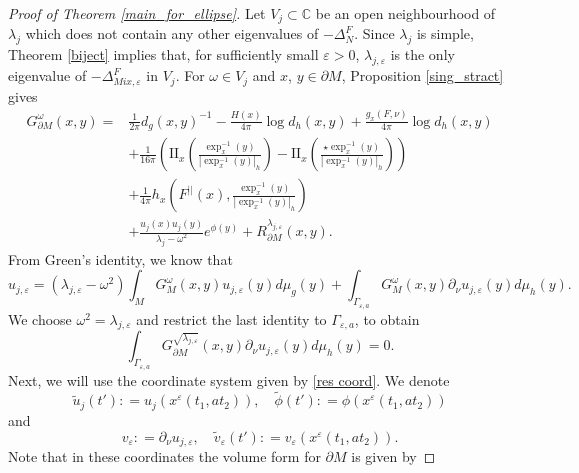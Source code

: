 \documentclass[12pt,a4paper]{amsart}
\numberwithin{equation}{section}
\theoremstyle{plain}
\theoremstyle{definition}
\begin{document}
\begin{proof}[Proof of Theorem \ref{main_for_ellipse}]
	Let $V_j\subset \mathbb{C}$ be an open neighbourhood of $\lambda_j$ which does not contain any other eigenvalues of $-\Delta_N^F$. Since $\lambda_j$ is simple, Theorem \ref{biject} implies that, for sufficiently small $\varepsilon>0$, $\lambda_{j,\varepsilon}$ is the only eigenvalue of $-\Delta_{Mix,\varepsilon}^F$ in $V_j$. For $\omega\in V_j$ and $x$, $y\in \partial M$, Proposition \ref{sing_stract} gives
	\begin{align*}
		G^{\omega}_{\partial M}(x,y)=&\frac{1}{2\pi}d_g(x,y)^{-1} -\frac{H(x)}{4\pi}\log d_h(x,y)+\frac{g_x(F,\nu)}{4\pi}\log d_h(x,y)\\ &+\frac{1}{16\pi}\left(\mathrm{II}_{x}\left(\frac{\exp_{x}^{-1}(y)}{|\exp_{x}^{-1}(y)|_h}\right)-\mathrm{II}_{x}\left(\frac{\star\exp_{x}^{-1}(y)}{|\exp_{x}^{-1}(y)|_h}\right)\right) \\
		& +\frac{1}{4\pi}h_{x}\left(F^{||}(x),\frac{\exp^{-1}_{x}(y)}{|\exp^{-1}_{x}(y)|_h}\right)\\
		& + \frac{u_j(x)u_j(y)}{\lambda_j - \omega^2}e^{\phi(y)}  + R_{\partial M}^{\lambda_{j,\varepsilon}}(x,y).
	\end{align*}
	From Green's identity, we know that
	\begin{equation*}
		u_{j,\varepsilon} = (\lambda_{j,\varepsilon} - \omega^2) \int_{M} G_{M}^\omega(x,y) u_{j,\varepsilon}(y) d\mu_g(y) + \int_{\Gamma_{\varepsilon, a}} G_M^{\omega}(x,y) \partial_{\nu} u_{j,\varepsilon}(y) d\mu_h(y).
	\end{equation*}
	We choose $\omega^2 = \lambda_{j,\varepsilon}$ and restrict the last identity to $\Gamma_{\varepsilon,a}$, to obtain
	\begin{equation}\label{gpu0}
		\int_{\Gamma_{\varepsilon, a}} G_{\partial M}^{\sqrt{\lambda_{j,\varepsilon}}}(x,y) \partial_{\nu} u_{j,\varepsilon}(y)d\mu_h(y) = 0.
	\end{equation}
	Next, we will use the coordinate system given by \eqref{res coord}. We denote 
	\begin{equation*}
		\tilde{u}_j(t'): = u_j(x^{\varepsilon}(t_1,at_2)),  \quad \tilde{\phi}(t'): = \phi(x^{\varepsilon}(t_1,at_2))
	\end{equation*}
	and
	\begin{equation*}
		v_\varepsilon : = \partial_{\nu} u_{j,\varepsilon},\quad \tilde{v}_\varepsilon(t'): = v_\varepsilon(x^{\varepsilon}(t_1,at_2)).
	\end{equation*}
	Note that in these coordinates the volume form for $\partial M$ is given by

\end{proof}
\end{document}
